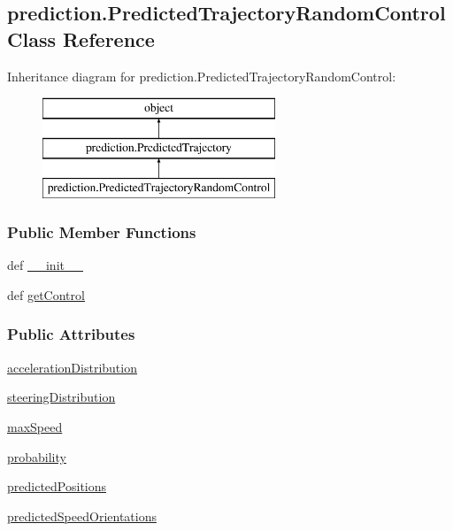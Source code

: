 \hypertarget{classprediction_1_1PredictedTrajectoryRandomControl}{\subsection{prediction.\-Predicted\-Trajectory\-Random\-Control Class Reference}
\label{classprediction_1_1PredictedTrajectoryRandomControl}
}
Inheritance diagram for prediction.\-Predicted\-Trajectory\-Random\-Control\-:\begin{figure}[H]
\begin{center}
\leavevmode
\includegraphics[height=3.000000cm]{classprediction_1_1PredictedTrajectoryRandomControl}
\end{center}
\end{figure}
\subsubsection*{Public Member Functions}
\begin{DoxyCompactItemize}
\item 
def \hyperlink{classprediction_1_1PredictedTrajectoryRandomControl_ab4654da0ee7d4a69dc840edb270c01d2}{\-\_\-\-\_\-init\-\_\-\-\_\-}
\item 
def \hyperlink{classprediction_1_1PredictedTrajectoryRandomControl_a51c585036b06659446c6fcb1e7c38d5e}{get\-Control}
\end{DoxyCompactItemize}
\subsubsection*{Public Attributes}
\begin{DoxyCompactItemize}
\item 
\hyperlink{classprediction_1_1PredictedTrajectoryRandomControl_a37965e61f6213fcff42144a466e15232}{acceleration\-Distribution}
\item 
\hyperlink{classprediction_1_1PredictedTrajectoryRandomControl_a48a17f8abdffcde24cf25b90ebeaf59d}{steering\-Distribution}
\item 
\hyperlink{classprediction_1_1PredictedTrajectoryRandomControl_afb0db36b133a6f189557d35904b49dc2}{max\-Speed}
\item 
\hyperlink{classprediction_1_1PredictedTrajectoryRandomControl_aadf38083f042ae0b97de23c78375eddf}{probability}
\item 
\hyperlink{classprediction_1_1PredictedTrajectoryRandomControl_a1b05261a0f5a1525512441eec9b9e12c}{predicted\-Positions}
\item 
\hyperlink{classprediction_1_1PredictedTrajectoryRandomControl_a7039d42cb1c2150efb1fd21f245f1c51}{predicted\-Speed\-Orientations}
\end{DoxyCompactItemize}


